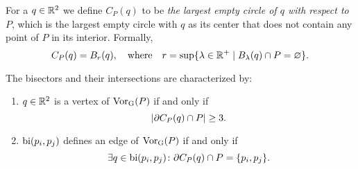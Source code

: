 \begin{defn}
For a $q \in \mathbb{R}^2$ we define $C_P(q)$ to be \emph{the largest empty circle of $q$ with respect to $P$}, which is the largest empty circle with $q$ as its center that does not contain any point of $P$ in its interior. Formally,
\[
    C_P(q) = B_r(q), \quad \text{where} \quad r = \sup\{\lambda \in \mathbb{R}^+ \mid B_{\lambda}(q) \cap P = \varnothing\}.
\]
\end{defn}
\begin{thm} \label{thm:characterizationofbisectors} The bisectors and their intersections are characterized by:
\begin{enumerate}[{(}i{)}]
    \item $q \in \mathbb{R}^2$ is a vertex of $\operatorname{Vor_{G}}(P)$ if and only if \[ \left\lvert \partial C_P(q) \cap P \right\rvert \geq 3. \]
    \item $\operatorname{bi}(p_i, p_j)$ defines an edge of $\operatorname{Vor_{G}}(P)$ if and only if \[ \exists q \in \operatorname{bi}(p_i, p_j) \colon \partial C_P(q) \cap P = \{p_i, p_j\}. \]
\end{enumerate}
\end{thm}
